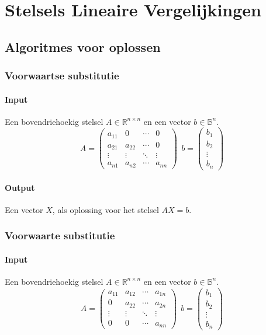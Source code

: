 \documentclass[samenvatting.tex]{subfiles}
\begin{document}
\chapter{Stelsels Lineaire Vergelijkingen}

\section{Algoritmes voor oplossen}
\subsection{Voorwaartse substitutie}
\subsubsection*{Input}
Een bovendriehoekig stelsel $A \in \mathbb{R}^{n\times n}$ en een vector $b \in \mathbb{B}^{n}$.
\[
A =
\begin{pmatrix}
a_{11} & 0 & \cdots & 0\\
a_{21} & a_{22} & \cdots & 0\\
\vdots & \vdots & \ddots & \vdots\\
a_{n1} & a_{n2} & \cdots & a_{nn}
\end{pmatrix}
\ { }\ 
b =
\begin{pmatrix}
b_{1}\\b_{2}\\\vdots\\b_{n}
\end{pmatrix}
\]
\subsubsection*{Output}
Een vector $X$, als oplossing voor het stelsel $AX=b$.

\subsection{Voorwaarte substitutie}
\subsubsection*{Input}
Een bovendriehoekig stelsel $A \in \mathbb{R}^{n\times n}$ en een vector $b \in \mathbb{B}^{n}$.
\[
A =
\begin{pmatrix}
a_{11} & a_{12} & \cdots & a_{1n}\\
0 & a_{22} & \cdots & a_{2n}\\
\vdots & \vdots & \ddots & \vdots\\
0 & 0 & \cdots & a_{nn}
\end{pmatrix}
\ { }\ 
b =
\begin{pmatrix}
b_{1}\\b_{2}\\\vdots\\b_{n}
\end{pmatrix}
\]
\end{document}
